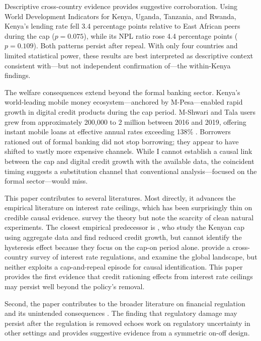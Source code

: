 \documentclass[12pt]{article}
\begin{document}
Descriptive cross-country evidence provides suggestive corroboration. Using World Development Indicators for Kenya, Uganda, Tanzania, and Rwanda, Kenya's lending rate fell 3.4 percentage points relative to East African peers during the cap ($p = 0.075$), while its NPL ratio rose 4.4 percentage points ($p = 0.109$). Both patterns persist after repeal. With only four countries and limited statistical power, these results are best interpreted as descriptive context consistent with---but not independent confirmation of---the within-Kenya findings.

The welfare consequences extend beyond the formal banking sector. Kenya's world-leading mobile money ecosystem---anchored by M-Pesa---enabled rapid growth in digital credit products during the cap period. M-Shwari and Tala users grew from approximately 200,000 to 2 million between 2016 and 2019, offering instant mobile loans at effective annual rates exceeding 138\% \citep{bharadwaj2019fintech, suri2017long}. Borrowers rationed out of formal banking did not stop borrowing; they appear to have shifted to vastly more expensive channels. While I cannot establish a causal link between the cap and digital credit growth with the available data, the coincident timing suggests a substitution channel that conventional analysis---focused on the formal sector---would miss.

This paper contributes to several literatures. Most directly, it advances the empirical literature on interest rate ceilings, which has been surprisingly thin on credible causal evidence. \citet{degryse2009microeconometrics} survey the theory but note the scarcity of clean natural experiments. The closest empirical predecessor is \citet{igan2023credit}, who study the Kenyan cap using aggregate data and find reduced credit growth, but cannot identify the hysteresis effect because they focus on the cap-on period alone. \citet{maimbo2014interest} provide a cross-country survey of interest rate regulations, and \citet{ferrari2018interest} examine the global landscape, but neither exploits a cap-and-repeal episode for causal identification. This paper provides the first evidence that credit rationing effects from interest rate ceilings may persist well beyond the policy's removal.

Second, the paper contributes to the broader literature on financial regulation and its unintended consequences \citep{agarwal2014inconsistent, buchak2018fintech, dagostino2022impact}. The finding that regulatory damage may persist after the regulation is removed echoes work on regulatory uncertainty in other settings \citep{baker2016measuring} and provides suggestive evidence from a symmetric on-off design.
\end{document}
